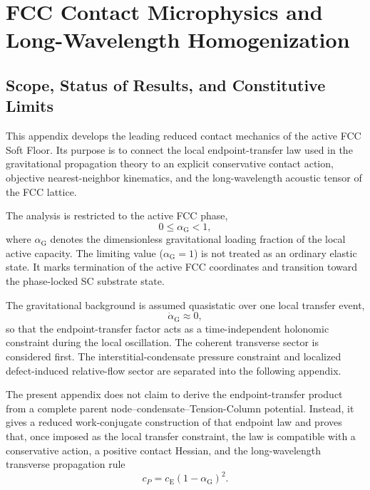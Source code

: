 \chapter{FCC Contact Microphysics and Long-Wavelength Homogenization}
\label{app:fcc_microphysics}

\section{Scope, Status of Results, and Constitutive Limits}

This appendix develops the leading reduced contact mechanics of the active FCC Soft Floor. Its purpose is to connect the local endpoint-transfer law used in the gravitational propagation theory to an explicit conservative contact action, objective nearest-neighbor kinematics, and the long-wavelength acoustic tensor of the FCC lattice.

The analysis is restricted to the active FCC phase,
\begin{equation}
    0 \leq \alpha_{\mathrm{G}} < 1,
\end{equation}
where $\alpha_{\mathrm{G}}$ denotes the dimensionless gravitational loading fraction of the local active capacity. The limiting value ($\alpha_{\mathrm{G}}=1$) is not treated as an ordinary elastic state. It marks termination of the active FCC coordinates and transition toward the phase-locked SC substrate state.

The gravitational background is assumed quasistatic over one local transfer event,
\begin{equation}
    \dot{\alpha}_{\mathrm{G}} \approx 0,
\end{equation}
so that the endpoint-transfer factor acts as a time-independent holonomic constraint during the local oscillation. The coherent transverse sector is considered first. The interstitial-condensate pressure constraint and localized defect-induced relative-flow sector are separated into the following appendix.

The present appendix does not claim to derive the endpoint-transfer product from a complete parent node--condensate--Tension-Column potential. Instead, it gives a reduced work-conjugate construction of that endpoint law and proves that, once imposed as the local transfer constraint, the law is compatible with a conservative action, a positive contact Hessian, and the long-wavelength transverse propagation rule
\begin{equation}
    c_P = c_{\mathrm{E}}(1-\alpha_{\mathrm{G}})^2.
\end{equation}


